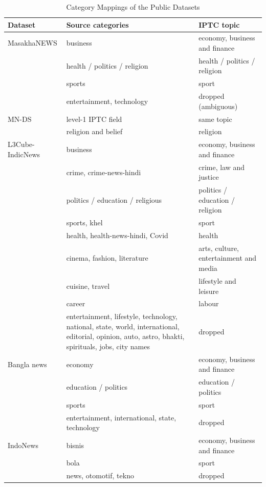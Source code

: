 \documentclass[journal,onecolumn]{IEEEtran}
\begin{document}
\begin{table}[!htbp]
\caption{Category Mappings of the Public Datasets}
\label{tab:catmap}
\centering
\footnotesize
\setlength{\tabcolsep}{4pt}
\begin{tabular}{@{}lp{}p{}@{}}
\toprule
Dataset & Source categories & IPTC topic \\
\midrule
MasakhaNEWS & business & economy, business and finance \\
 & health / politics / religion & health / politics / religion \\
 & sports & sport \\
 & entertainment, technology & dropped (ambiguous) \\
MN-DS & level-1 IPTC field & same topic \\
 & religion and belief & religion \\
L3Cube-IndicNews & business & economy, business and finance \\
 & crime, crime-news-hindi & crime, law and justice \\
 & politics / education / religious & politics / education / religion \\
 & sports, khel & sport \\
 & health, health-news-hindi, Covid & health \\
 & cinema, fashion, literature & arts, culture, entertainment and media \\
 & cuisine, travel & lifestyle and leisure \\
 & career & labour \\
 & entertainment, lifestyle, technology, national, state, world, international, editorial, opinion, auto, astro, bhakti, spirituals, jobs, city names & dropped \\
Bangla news & economy & economy, business and finance \\
 & education / politics & education / politics \\
 & sports & sport \\
 & entertainment, international, state, technology & dropped \\
IndoNews & bisnis & economy, business and finance \\
 & bola & sport \\
 & news, otomotif, tekno & dropped \\
\bottomrule
\end{tabular}
\end{table}
\end{document}
